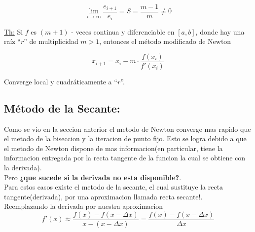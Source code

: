 \begin{center}
\begin{equation*}
\lim_{i\to \infty} \frac{e_{i+1}}{e_i} = S = \frac{m-1}{m} \neq 0
\end{equation*}
\end{center}
\vspace{0.5cm}
\underline{Th:} Si \(f\) es \((m+1)\) - veces continua y diferenciable en \([a, b]\), donde hay una raíz ``\(r\)'' de multiplicidad \(m > 1\), entonces el método modificado de Newton\\
\begin{center}
\begin{equation*}
x_{i+1} = x_i - m \cdot \frac{f(x_i)}{f'(x_i)}
\end{equation*}
\end{center}
Converge local y cuadráticamente a ``\(r\)''.

\raggedright
\subsection{Método de la Secante:}
Como se vio en la seccion anterior el metodo de Newton converge mas rapido que el metodo de la biseccion y la iteracion de punto fijo. Esto se logra debido a que el metodo de Newton dispone de mas informacion(en particular, tiene la informacion entregada por la recta tangente de la funcion la cual se obtiene con la derivada).\\
Pero \textbf{¿que sucede si la derivada no esta disponible?}.\\
\vspace{0.2cm}
Para estos casos existe el metodo de la secante, el cual sustituye la recta tangente(derivada), por una aproximacion llamada recta secante!.\\

\vspace{0.8cm}
Reemplazando la derivada por nuestra aproximacion\\
\begin{equation*}
	f'(x) \approx \frac{f(x) - f(x - \Delta x)}{x - (x - \Delta x)} = \frac{f(x) - f(x-\Delta x)}{\Delta x}
\end{equation*}

